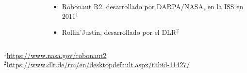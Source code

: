 \documentclass[10pt,spanish,aspectratio=1610]{beamer}
\begin{document}
\begin{frame}
\begin{columns}
\begin{column}{0.5\textwidth}
\begin{figure}
      \end{figure}
    \end{column}
    \begin{column}{0.5\textwidth}
      \begin{itemize}
      \item Robonaut R2, desarrollado por DARPA/NASA, en la ISS en 2011$^1$
      \item Rollin'Justin, desarrollado por el DLR$^2$
      \end{itemize}
    \end{column}
  \end{columns}
  $^1$\footnotesize{\url{https://www.nasa.gov/robonaut2}}\\
  $^2$\footnotesize{\url{https://www.dlr.de/rm/en/desktopdefault.aspx/tabid-11427/}}
\end{frame}
\end{document}
